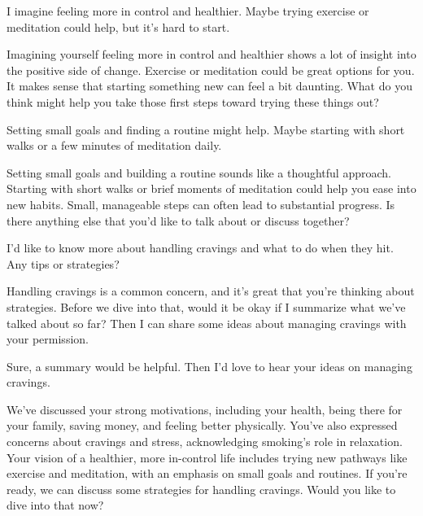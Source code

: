 \begin{clientbox}
	I imagine feeling more in control and healthier. Maybe trying exercise or meditation could help, but it's hard to start.
\end{clientbox}

\begin{counsellorbox}
	Imagining yourself feeling more in control and healthier shows a lot of insight into the positive side of change. Exercise or meditation could be great options for you. It makes sense that starting something new can feel a bit daunting. What do you think might help you take those first steps toward trying these things out?
\end{counsellorbox}

\begin{clientbox}
	Setting small goals and finding a routine might help. Maybe starting with short walks or a few minutes of meditation daily.
\end{clientbox}

\begin{counsellorbox}
	Setting small goals and building a routine sounds like a thoughtful approach. Starting with short walks or brief moments of meditation could help you ease into new habits. Small, manageable steps can often lead to substantial progress. Is there anything else that you’d like to talk about or discuss together?
\end{counsellorbox}

\begin{clientbox}
	I'd like to know more about handling cravings and what to do when they hit. Any tips or strategies?
\end{clientbox}

\begin{counsellorbox}
	Handling cravings is a common concern, and it's great that you're thinking about strategies. Before we dive into that, would it be okay if I summarize what we've talked about so far? Then I can share some ideas about managing cravings with your permission.
\end{counsellorbox}

\begin{clientbox}
	Sure, a summary would be helpful. Then I'd love to hear your ideas on managing cravings.
\end{clientbox}

\begin{counsellorbox}
	We've discussed your strong motivations, including your health, being there for your family, saving money, and feeling better physically. You've also expressed concerns about cravings and stress, acknowledging smoking's role in relaxation. Your vision of a healthier, more in-control life includes trying new pathways like exercise and meditation, with an emphasis on small goals and routines. If you're ready, we can discuss some strategies for handling cravings. Would you like to dive into that now?
\end{counsellorbox}

